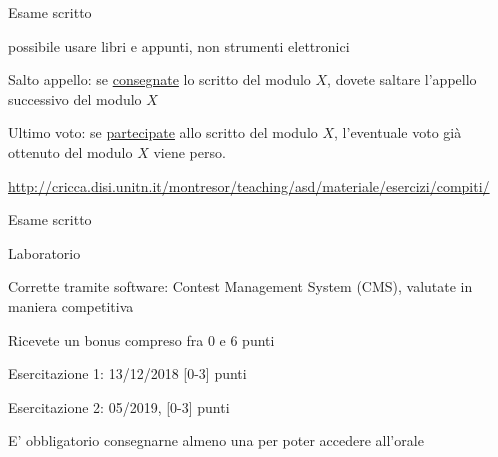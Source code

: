 \begin{frame}{Esame scritto}

\vspace{-9pt}
\begin{myboxtitle}
\BI
\item \EE possibile usare libri e appunti, non strumenti elettronici
\EI
\end{myboxtitle}

\begin{myboxtitle}[Regole]
\BI
\item \alert{Salto appello}: se \underline{consegnate} lo scritto del modulo $X$, dovete saltare l'appello successivo del modulo $X$
\item \alert{Ultimo voto}: se \underline{partecipate} allo scritto del modulo $X$, l'eventuale voto già ottenuto del modulo $X$ viene perso.
\EI
\end{myboxtitle}

\begin{myboxtitle}
\small
\url{http://cricca.disi.unitn.it/montresor/teaching/asd/materiale/esercizi/compiti/}
\end{myboxtitle}

\end{frame}
\begin{frame}{Esame scritto}
\vspace{-18pt}
\end{frame}
\begin{frame}{Laboratorio}
	
\vspace{-9pt}
\BI
\item Corrette tramite software: Contest Management System (CMS), valutate in maniera competitiva
\item Ricevete un bonus compreso fra 0 e 6 punti
\BI
\item Esercitazione 1: 13/12/2018 [0-3] punti
\item Esercitazione 2: 05/2019, [0-3] punti
\EI
\item E' obbligatorio consegnarne almeno una per poter accedere all'orale 
\EI

\end{frame}

